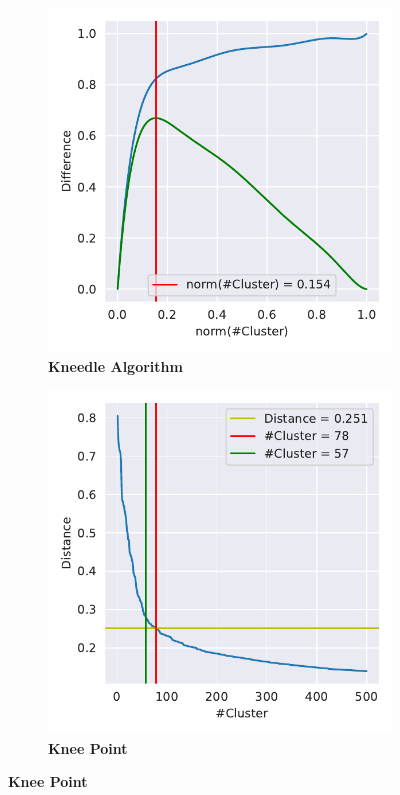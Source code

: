 \FloatBarrier

\begin{figure}[!hbt]
    \centering
    \begin{subfigure}[b]{0.475\textwidth}
        \caption[Kneedle Algorithm]{\textbf{Kneedle Algorithm}}
        \label{subfig:Result_Cluster_Knee_Kneedle_4}            \includegraphics[width=\textwidth]{Results/Cluster_Knee_Segment_4.pdf}
    \end{subfigure}
    \hfill
    \begin{subfigure}[b]{0.475\textwidth}
        \caption[Kneedle point]{\textbf{Knee Point}}
        \label{subfig:Result_Cluster_Knee_Elbow_4}            \includegraphics[width=\textwidth]{Results/Cluster_Elbow_Knee_Segment_4.pdf}

\end{subfigure}
\end{figure}
